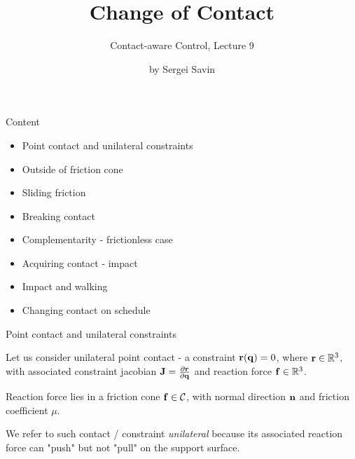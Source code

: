 \documentclass{beamer}
\title{Change of Contact}
\subtitle{Contact-aware Control, Lecture 9}
\author{by Sergei Savin}
\date{\mydate}
\begin{document}
\maketitle


\begin{frame}{Content}

\begin{itemize}
\item Point contact and unilateral constraints
\item Outside of friction cone
\item Sliding friction
\item Breaking contact
\item Complementarity - frictionless case
\item Acquiring contact - impact
\item Impact and walking
\item Changing contact on schedule
\end{itemize}

\end{frame}


\begin{frame}{Point contact and unilateral constraints}
	\begin{flushleft}
		
		Let us consider unilateral point contact - a constraint $\mathbf{r}(\mathbf{q}) = 0$, where $\mathbf{r} \in \mathbb{R}^3$, with associated constraint jacobian $\mathbf{J} = \frac{\partial \mathbf{r}}{\partial \mathbf{q}}$ and reaction force $\mathbf{f} \in \mathbb{R}^3$.
		
		\bigskip
		
		Reaction force lies in a friction cone $\mathbf{f} \in \mathcal{C}$, with normal direction $\mathbf{n}$ and friction coefficient $\mu$.
		
		\bigskip
		
		We refer to such contact / constraint \emph{unilateral} because its associated reaction force can "push" but not "pull" on the support surface.
		
	\end{flushleft}
\end{frame}
\end{document}
